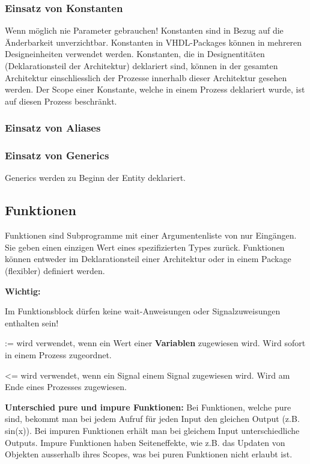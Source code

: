 \subsubsection{Einsatz von Konstanten}
Wenn möglich nie Parameter gebrauchen! Konstanten sind in Bezug auf die Änderbarkeit unverzichtbar. Konstanten in VHDL-Packages können in mehreren Designeinheiten verwendet werden. Konstanten, die in Designentitäten (Deklarationsteil der Architektur) deklariert sind, können in der gesamten Architektur einschliesslich der Prozesse innerhalb dieser Architektur gesehen werden. Der Scope einer Konstante, welche in einem Prozess deklariert wurde, ist auf diesen Prozess beschränkt.

\subsubsection{Einsatz von Aliases}

\subsubsection{Einsatz von Generics}
Generics werden zu Beginn der Entity deklariert.


\subsection{Funktionen}
Funktionen sind Subprogramme mit einer Argumentenliste von nur Eingängen. Sie geben einen einzigen Wert eines spezifizierten Types zurück. Funktionen können entweder im Deklarationsteil einer Architektur oder in einem Package (flexibler) definiert werden.

\textbf{Wichtig:}
\begin{compactitem}
    \item Im Funktionsblock dürfen keine wait-Anweisungen oder Signalzuweisungen enthalten sein!
    \item := wird verwendet, wenn ein Wert einer \textbf{Variablen} zugewiesen wird. Wird sofort in einem Prozess zugeordnet.
    \item \textless= wird verwendet, wenn ein Signal einem Signal zugewiesen wird. Wird am Ende eines Prozesses zugewiesen.
\end{compactitem}
\textbf{Unterschied pure und impure Funktionen:} Bei Funktionen, welche pure sind, bekommt man bei jedem Aufruf für jeden Input den gleichen Output (z.B. sin(x)). Bei impuren Funktionen erhält man bei gleichem Input unterschiedliche Outputs. Impure Funktionen haben Seiteneffekte, wie z.B. das Updaten von Objekten ausserhalb ihres Scopes, was bei puren Funktionen nicht erlaubt ist.


